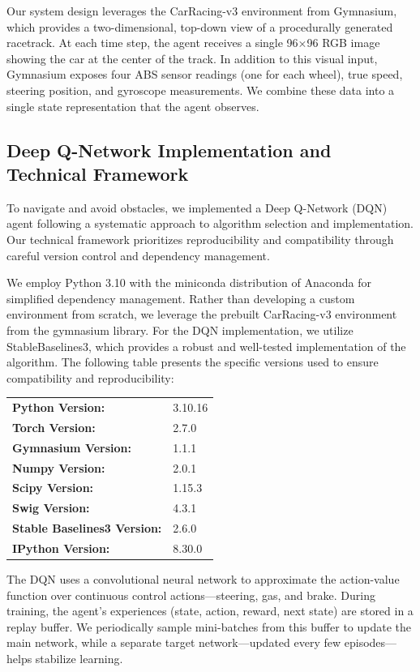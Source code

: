 Our system design leverages the CarRacing-v3 environment from Gymnasium, which provides a two-dimensional, top-down view of a procedurally generated racetrack. At each time step, the agent receives a single 96×96 RGB image showing the car at the center of the track. In addition to this visual input, Gymnasium exposes four ABS sensor readings (one for each wheel), true speed, steering position, and gyroscope measurements. We combine these data into a single state representation that the agent observes.


\subsection{Deep Q-Network Implementation and Technical Framework}

To navigate and avoid obstacles, we implemented a Deep Q-Network (DQN) agent following a systematic approach to algorithm selection and implementation. Our technical framework prioritizes reproducibility and compatibility through careful version control and dependency management.

We employ Python 3.10 with the miniconda distribution of Anaconda for simplified dependency management. Rather than developing a custom environment from scratch, we leverage the prebuilt CarRacing-v3 environment from the gymnasium library. For the DQN implementation, we utilize StableBaselines3, which provides a robust and well-tested implementation of the algorithm. The following table presents the specific versions used to ensure compatibility and reproducibility:

\begin{center}
\begin{tabular}{ll}
  \textbf{Python Version:} & 3.10.16 \\
  \textbf{Torch Version:} & 2.7.0 \\
  \textbf{Gymnasium Version:} & 1.1.1 \\
  \textbf{Numpy Version:} & 2.0.1 \\
  \textbf{Scipy Version:} & 1.15.3 \\
  \textbf{Swig Version:} & 4.3.1 \\
  \textbf{Stable Baselines3 Version:} & 2.6.0 \\
  \textbf{IPython Version:} & 8.30.0 \\
\end{tabular}
\end{center}

The DQN uses a convolutional neural network to approximate the action-value function over continuous control actions—steering, gas, and brake. During training, the agent’s experiences (state, action, reward, next state) are stored in a replay buffer. We periodically sample mini-batches from this buffer to update the main network, while a separate target network—updated every few episodes—helps stabilize learning.

